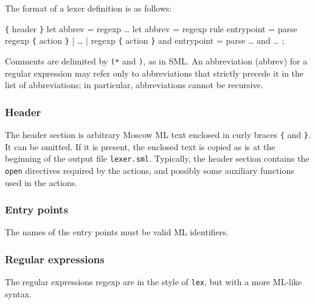 \documentclass[fleqn]{article}
\begin{document}
The format of a lexer definition is as follows:

\begin{program}
\verb#{# {\rm header} \verb#}#
let {\rm abbrev} = {\rm regexp}
\ldots
let {\rm abbrev} = {\rm regexp}
rule {\rm entrypoint} =
  parse {\rm regexp} \verb#{# {\rm action} \verb#}#
      | \ldots
      | {\rm regexp} \verb#{# {\rm action} \verb#}#
and {\rm entrypoint} =
  parse \ldots
and \ldots
;
\end{program}

\noindent Comments are delimited by {\tt (*} and {\tt *)}, as in
SML\@.  An abbreviation (abbrev) for a regular expression may refer
only to abbreviations that strictly precede it in the list of
abbreviations; in particular, abbreviations cannot be recursive.


\subsubsection{Header}

The header section is arbitrary Moscow ML text enclosed in curly
braces \verb#{# and \verb#}#.  It can be omitted.  If it is present,
the enclosed text is copied as is at the beginning of the output file
{\tt lexer.sml}.  Typically, the header section contains the {\tt
  open} directives required by the actions, and possibly some
auxiliary functions used in the actions.

\subsubsection{Entry points}

The names of the entry points must be valid ML identifiers.

\subsubsection{Regular expressions}

The regular expressions regexp are in the style of {\tt lex}, but with
a more ML-like syntax.
\end{document}
